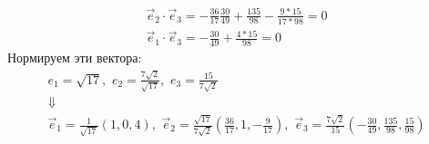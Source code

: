 \begin{solution}
\begin{gather}
        \vec{e}_2\cdot\vec{e}_3 = -\frac{36}{17}\frac{30}{49}+\frac{135}{98}-\frac{9*15}{17*98} = 0 \\
        \vec{e}_1\cdot\vec{e}_3 = -\frac{30}{49} + \frac{4*15}{98} = 0
    \end{gather}
    Нормируем эти вектора:
    \begin{gather}
        e_1 = \sqrt{17},\,\,
        e_2 = \frac{7\sqrt{2}}{\sqrt{17}},\,\,
        e_3 = \frac{15}{7\sqrt{2}} \\
        \Downarrow \\
        \vec{e}_1 = \frac{1}{\sqrt{17}}(1,0,4),\,\,\vec{e}_2 = \frac{\sqrt{17}}{7\sqrt{2}}\left(\frac{36}{17},1,-\frac{9}{17}\right),\,\,\vec{e}_3 = \frac{7\sqrt{2}}{15}\left(-\frac{30}{49},\frac{135}{98},\frac{15}{98}\right)
    \end{gather}

\end{solution}